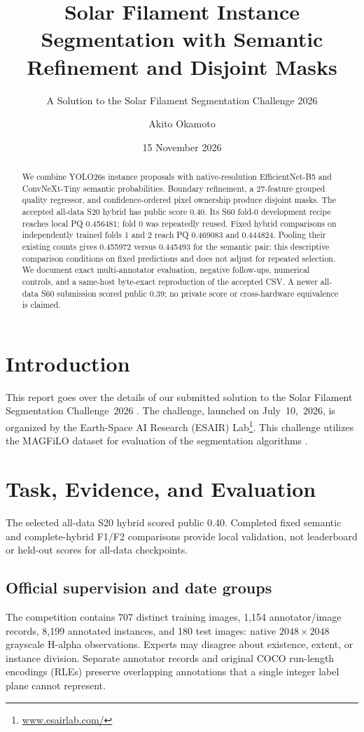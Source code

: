 \documentclass[sigconf]{acmart}
\title[Semantic Refinement and Disjoint Masks]{Solar Filament Instance Segmentation with Semantic Refinement and Disjoint Masks}
\subtitle{A Solution to the Solar Filament Segmentation Challenge 2026}
\author{Akito Okamoto}
\affiliation{%
  \institution{Doshisha University}
  \country{Japan}
}
\date{15 November 2026}
\begin{document}
\begin{abstract}
We combine YOLO26s instance proposals with native-resolution EfficientNet-B5 and ConvNeXt-Tiny semantic probabilities. Boundary refinement, a 27-feature grouped quality regressor, and confidence-ordered pixel ownership produce disjoint masks. The accepted all-data S20 hybrid has public score 0.40. Its S60 fold-0 development recipe reaches local PQ 0.456481; fold 0 was repeatedly reused. Fixed hybrid comparisons on independently trained folds 1 and 2 reach PQ 0.469083 and 0.444824. Pooling their existing counts gives 0.455972 versus 0.445493 for the semantic pair; this descriptive comparison conditions on fixed predictions and does not adjust for repeated selection. We document exact multi-annotator evaluation, negative follow-ups, numerical controls, and a same-host byte-exact reproduction of the accepted CSV. A newer all-data S60 submission scored public 0.39; no private score or cross-hardware equivalence is claimed.
\end{abstract}
\maketitle

\section{Introduction}
This report goes over the details of our submitted solution to the Solar Filament Segmentation Challenge~2026 \cite{filament-segmentation-2026}. The challenge, launched on July~10,~2026, is organized by the Earth-Space AI Research (ESAIR) Lab\footnote{\href{https://www.esairlab.com/home}{www.esairlab.com/}}. This challenge utilizes the MAGFiLO dataset for evaluation of the segmentation algorithms \cite{ahmadzadeh2024dataset}.

\section{Task, Evidence, and Evaluation}
The selected all-data S20 hybrid scored public 0.40. Completed fixed semantic and complete-hybrid F1/F2 comparisons provide local validation, not leaderboard or held-out scores for all-data checkpoints.

\subsection{Official supervision and date groups}
The competition contains 707 distinct training images, 1,154 annotator/image records, 8,199 annotated instances, and 180 test images: native $2048\times2048$ grayscale H-alpha observations. Experts may disagree about existence, extent, or instance division. Separate annotator records and original COCO run-length encodings (RLEs) preserve overlapping annotations that a single integer label plane cannot represent.
\end{document}
